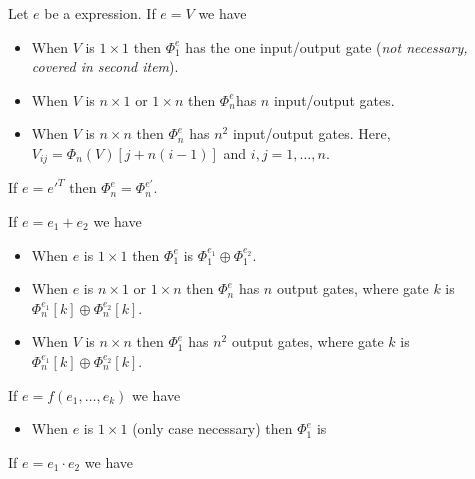 Let $e$ be a \langfor expression. If $e=V$ we have
\begin{itemize}
	\item When $V$ is $1\times 1$ then $\Phi^e_1$ has the one input/output gate (\textit{not necessary, covered in second item}).
	\item When $V$ is $n\times 1$ or $1\times n$ then $\Phi^e_n$has $n$ input/output gates.
	\item When $V$ is $n\times n$ then $\Phi^e_n$ has $n^2$ input/output gates. Here, $V_{ij}=\Phi_n(V)\left[ j+n(i-1)\right]$ and $i,j=1,\ldots, n$.
\end{itemize}

If $e=e'^T$ then $\Phi^e_n=\Phi^{e'}_n$. 

If $e=e_1 + e_2$ we have

\begin{itemize}
	\item When $e$ is $1\times 1$ then $\Phi^e_1$ is $\Phi^{e_1}_1 \oplus \Phi^{e_2}_1$.
	\item When $e$ is $n\times 1$ or $1\times n$ then $\Phi^e_n$ has $n$ output gates, where gate $k$ is $\Phi^{e_1}_n[k] \oplus \Phi^{e_2}_n[k]$.
	\item When $V$ is $n\times n$ then $\Phi^e_1$ has $n^2$ output gates, where gate $k$ is $\Phi^{e_1}_n[k] \oplus \Phi^{e_2}_n[k]$.
\end{itemize}

If $e=f(e_1, \ldots, e_k)$ we have

\begin{itemize}
	\item When $e$ is $1\times 1$ (only case necessary) then $\Phi^e_1$ is 
	
\begin{center}
\end{center}

\end{itemize}

If $e=e_1\cdot e_2$ we have

